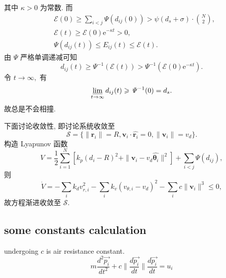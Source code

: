 \documentclass{article}
\theoremstyle{definition} %
\begin{document}
其中 $\kappa>0$ 为常数. 而
\begin{align*}
     & \mathcal{E}(0)\geqslant\sum_{i<j}\mathit{\Psi}(d_{ij}(0))>\psi(d_s+\sigma)\cdot\binom{N}{2}, \\
     & \mathcal{E}(t)\geqslant\mathcal{E}(0)\mathrm{e}^{-\kappa t}>0,                               \\
     & \mathit{\Psi}(d_{ij}(t))\leqslant E_{ij}(t)\leqslant\mathcal{E}(t).
\end{align*}
由 $\mathit{\Psi}$ 严格单调递减可知
\begin{equation*}
    d_{ij}(t)\geqslant\mathit{\Psi}^{-1}(\mathcal{E}(t))>\mathit{\Psi}^{-1}(\mathcal{E}(0)\mathrm{e}^{-\kappa t}).
\end{equation*}
令 $t\to\infty,$ 有
\begin{equation*}
    \varliminf_{t\to\infty}d_{ij}(t)\geqslant\mathit{\Psi}^{-1}(0)=d_s.
\end{equation*}
故总是不会相撞.\par
下面讨论收敛性, 即讨论系统收敛至
\begin{equation*}
    \mathcal{S}=\{\|\boldsymbol{r}_i\|=R,\boldsymbol{v}_i\cdot\widehat{\boldsymbol{r}_i}=0,\|\boldsymbol{v}_i\|=v_d\}.
\end{equation*}
构造 Lyapunov 函数
\begin{equation*}
    V=\frac{1}{2}\sum_{i=1}^N[k_p(d_i-R)^2+\|\boldsymbol{v}_i-v_d\widehat{\boldsymbol{\theta}_i}\|^2]+\sum_{i<j}\mathit{\Psi}(d_{ij}),
\end{equation*}
则
\begin{equation*}
    \dot{V}=-\sum_{i}k_dv_{r,i}^2-\sum_ik_v(v_{\theta,i}-v_d)^2-\sum_ic\|\boldsymbol{v}_i\|^3\leqslant0,
\end{equation*}
故方程渐进收敛至 $\mathcal{S}$.
\subsection{some constants calculation}
undergoing
\(c\) is air resistance constant.
\[
    m\frac{d^2 \vec{p_i}}{dt^2}+c\|\frac{d\vec{p_i}}{dt}\|\frac{d\vec{p_i}}{dt}=u_i
\]



\end{document}
